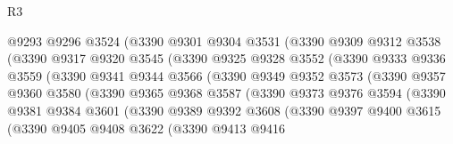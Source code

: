 \begin{lexlean}{R3}
\begin{coremodule}
                      @9293
                      @9296
                      @3524
                      (@3390
                        @9301
                        @9304
                        @3531
                        (@3390
                          @9309
                          @9312
                          @3538
                          (@3390
                            @9317
                            @9320
                            @3545
                            (@3390
                              @9325
                              @9328
                              @3552
                              (@3390
                                @9333
                                @9336
                                @3559
                                (@3390
                                  @9341
                                  @9344
                                  @3566
                                  (@3390
                                    @9349
                                    @9352
                                    @3573
                                    (@3390
                                      @9357
                                      @9360
                                      @3580
                                      (@3390
                                        @9365
                                        @9368
                                        @3587
                                        (@3390
                                          @9373
                                          @9376
                                          @3594
                                          (@3390
                                            @9381
                                            @9384
                                            @3601
                                            (@3390
                                              @9389
                                              @9392
                                              @3608
                                              (@3390
                                                @9397
                                                @9400
                                                @3615
                                                (@3390
                                                  @9405
                                                  @9408
                                                  @3622
                                                  (@3390
                                                    @9413
                                                    @9416

\end{coremodule}
\end{lexlean}
